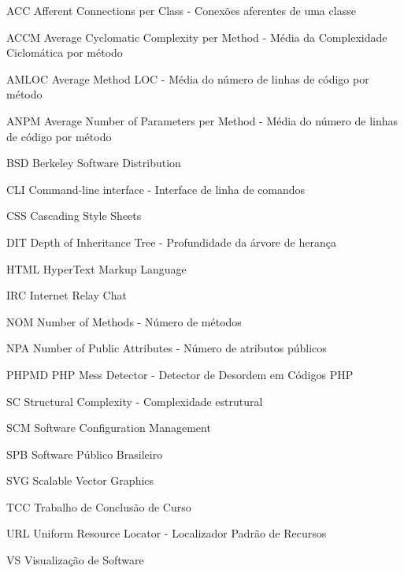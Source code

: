 \begin{siglas}
 \item[ACC] Afferent Connections per Class - Conexões aferentes de uma classe
 \item[ACCM] Average Cyclomatic Complexity per Method - Média da Complexidade Ciclomática por método
 \item[AMLOC] Average Method LOC - Média do número de linhas de código por método
 \item[ANPM] Average Number of Parameters per Method - Média do número de linhas de código por método
 \item[BSD] Berkeley Software Distribution
 \item[CLI] Command-line interface - Interface de linha de comandos
 \item[CSS] Cascading Style Sheets
 \item[DIT] Depth of Inheritance Tree - Profundidade da árvore de herança
 \item[HTML] HyperText Markup Language
 \item[IRC] Internet Relay Chat
 \item[NOM] Number of Methods - Número de métodos
 \item[NPA] Number of Public Attributes - Número de atributos públicos
 \item[PHPMD] PHP Mess Detector - Detector de Desordem em Códigos PHP
 \item[SC] Structural Complexity - Complexidade estrutural
 \item[SCM] Software Configuration Management
 \item[SPB] Software Público Brasileiro
 \item[SVG] Scalable Vector Graphics
 \item[TCC] Trabalho de Conclusão de Curso
 \item[URL] Uniform Resource Locator - Localizador Padrão de Recursos
 \item[VS] Visualização de Software
\end{siglas}

